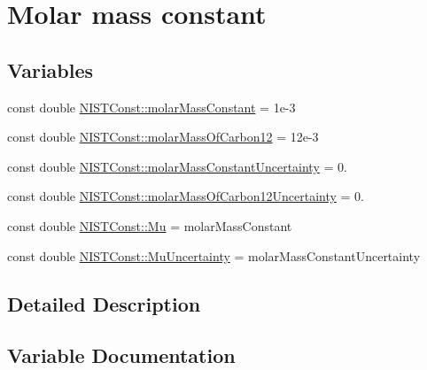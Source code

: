 \hypertarget{group___molar_mass_constant}{}\section{Molar mass constant}
\label{group___molar_mass_constant}
\subsection*{Variables}
\begin{DoxyCompactItemize}
\item 
const double \hyperlink{group___molar_mass_constant_ga83c1719df0cda1b4eae15de014b8f857}{N\+I\+S\+T\+Const\+::molar\+Mass\+Constant} = 1e-\/3
\item 
const double \hyperlink{group___molar_mass_constant_gab1aae3b38f21cb9a15fdc8209d3cf1f0}{N\+I\+S\+T\+Const\+::molar\+Mass\+Of\+Carbon12} = 12e-\/3
\item 
const double \hyperlink{group___molar_mass_constant_ga7aea373fd7ef8740aa22140aab339ce8}{N\+I\+S\+T\+Const\+::molar\+Mass\+Constant\+Uncertainty} = 0.
\item 
const double \hyperlink{group___molar_mass_constant_gae2fea17985c3e8877e1baab9f9382676}{N\+I\+S\+T\+Const\+::molar\+Mass\+Of\+Carbon12\+Uncertainty} = 0.
\item 
const double \hyperlink{group___molar_mass_constant_ga06104635bf45affb9e10a3f6581b4076}{N\+I\+S\+T\+Const\+::\+Mu} = molar\+Mass\+Constant
\item 
const double \hyperlink{group___molar_mass_constant_gacb7d27c9a39a3add815f0c8b97d5b425}{N\+I\+S\+T\+Const\+::\+Mu\+Uncertainty} = molar\+Mass\+Constant\+Uncertainty
\end{DoxyCompactItemize}


\subsection{Detailed Description}


\subsection{Variable Documentation}
\mbox{\label{group___molar_mass_constant_ga83c1719df0cda1b4eae15de014b8f857}} 
